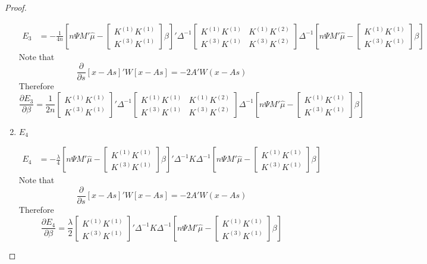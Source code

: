 \begin{proof}
\begin{enumerate}
    \begin{align}
        E_3&=-\frac{1}{4n} 
        \left[n\Psi M' \hat{\mu} -\begin{bmatrix}K^{(1)}K^{(1)} \\ K^{(3)}K^{(1)} \end{bmatrix} \beta\right]'
        \Delta^{-1}
       \begin{bmatrix} K^{(1)}K^{(1)} & K^{(1)} K^{(2)} \\ K^{(3)} K^{(1)} & K^{(3)}K^{(2)}\end{bmatrix}
        \Delta^{-1}
\left[n\Psi M' \hat{\mu} -\begin{bmatrix}K^{(1)}K^{(1)} \\ K^{(3)}K^{(1)} \end{bmatrix} \beta\right]
    \end{align}
Note that
$$
\frac{\partial }{\partial s} [x-As]'W[x-As]=-2A'W(x-As)
$$
Therefore
$$
\frac{\partial E_3}{\partial \beta}=\frac{1}{2n}\begin{bmatrix}K^{(1)}K^{(1)} \\ K^{(3)}K^{(1)} \end{bmatrix}'    
\Delta^{-1}
       \begin{bmatrix} K^{(1)}K^{(1)} & K^{(1)} K^{(2)} \\ K^{(3)} K^{(1)} & K^{(3)}K^{(2)}\end{bmatrix}
        \Delta^{-1}
        \left[n\Psi M' \hat{\mu} -\begin{bmatrix}K^{(1)}K^{(1)} \\ K^{(3)}K^{(1)} \end{bmatrix} \beta\right]
$$
    
    \item $E_4$
    
     \begin{align}
        E_4&=-\frac{\lambda}{4} 
        \left[n\Psi M' \hat{\mu} -\begin{bmatrix}K^{(1)}K^{(1)} \\ K^{(3)}K^{(1)} \end{bmatrix} \beta\right]'
        \Delta^{-1}
        K
        \Delta^{-1}
\left[n\Psi M' \hat{\mu} -\begin{bmatrix}K^{(1)}K^{(1)} \\ K^{(3)}K^{(1)} \end{bmatrix} \beta\right]
    \end{align}
Note that
$$
\frac{\partial }{\partial s} [x-As]'W[x-As]=-2A'W(x-As)
$$
Therefore
$$
\frac{\partial E_4}{\partial \beta}=\frac{\lambda}{2}\begin{bmatrix}K^{(1)}K^{(1)} \\ K^{(3)}K^{(1)} \end{bmatrix}'   
\Delta^{-1}
       K
        \Delta^{-1}
        \left[n\Psi M' \hat{\mu} -\begin{bmatrix}K^{(1)}K^{(1)} \\ K^{(3)}K^{(1)} \end{bmatrix} \beta\right]
$$
    

\end{enumerate}
\end{proof}

